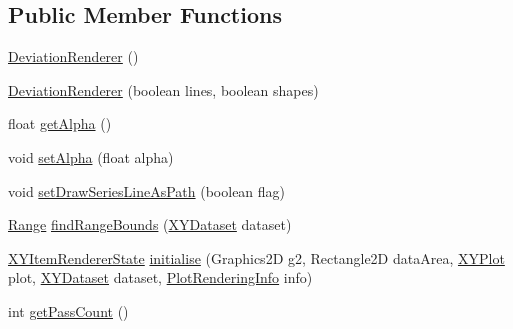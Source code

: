 \subsection*{Public Member Functions}
\begin{DoxyCompactItemize}
\item 
\mbox{\hyperlink{classorg_1_1jfree_1_1chart_1_1renderer_1_1xy_1_1_deviation_renderer_a39838945ccbf09e4df6d6ad9d3850b7f}{Deviation\+Renderer}} ()
\item 
\mbox{\hyperlink{classorg_1_1jfree_1_1chart_1_1renderer_1_1xy_1_1_deviation_renderer_a31b4b8a3e01afc21b31de052da1973bf}{Deviation\+Renderer}} (boolean lines, boolean shapes)
\item 
float \mbox{\hyperlink{classorg_1_1jfree_1_1chart_1_1renderer_1_1xy_1_1_deviation_renderer_a8b1564f272400a7d1a1d67e665869c98}{get\+Alpha}} ()
\item 
void \mbox{\hyperlink{classorg_1_1jfree_1_1chart_1_1renderer_1_1xy_1_1_deviation_renderer_a4cb9b69ec80e4f75dfcd78faf571479d}{set\+Alpha}} (float alpha)
\item 
void \mbox{\hyperlink{classorg_1_1jfree_1_1chart_1_1renderer_1_1xy_1_1_deviation_renderer_acd18116f34208f6aa6409def9afb6a0e}{set\+Draw\+Series\+Line\+As\+Path}} (boolean flag)
\item 
\mbox{\hyperlink{classorg_1_1jfree_1_1data_1_1_range}{Range}} \mbox{\hyperlink{classorg_1_1jfree_1_1chart_1_1renderer_1_1xy_1_1_deviation_renderer_a64df62469b198e1978d615f2c6bf5b36}{find\+Range\+Bounds}} (\mbox{\hyperlink{interfaceorg_1_1jfree_1_1data_1_1xy_1_1_x_y_dataset}{X\+Y\+Dataset}} dataset)
\item 
\mbox{\hyperlink{classorg_1_1jfree_1_1chart_1_1renderer_1_1xy_1_1_x_y_item_renderer_state}{X\+Y\+Item\+Renderer\+State}} \mbox{\hyperlink{classorg_1_1jfree_1_1chart_1_1renderer_1_1xy_1_1_deviation_renderer_a41aba322ce88935ec1c4c89148a74caa}{initialise}} (Graphics2D g2, Rectangle2D data\+Area, \mbox{\hyperlink{classorg_1_1jfree_1_1chart_1_1plot_1_1_x_y_plot}{X\+Y\+Plot}} plot, \mbox{\hyperlink{interfaceorg_1_1jfree_1_1data_1_1xy_1_1_x_y_dataset}{X\+Y\+Dataset}} dataset, \mbox{\hyperlink{classorg_1_1jfree_1_1chart_1_1plot_1_1_plot_rendering_info}{Plot\+Rendering\+Info}} info)
\item 
int \mbox{\hyperlink{classorg_1_1jfree_1_1chart_1_1renderer_1_1xy_1_1_deviation_renderer_a4322352e085792cfb2488cecf2c24efb}{get\+Pass\+Count}} ()
\item 

\end{DoxyCompactItemize}
